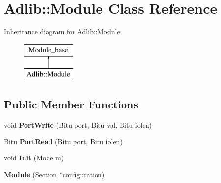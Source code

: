 \hypertarget{classAdlib_1_1Module}{\section{Adlib\-:\-:Module Class Reference}
\label{classAdlib_1_1Module}
}
Inheritance diagram for Adlib\-:\-:Module\-:\begin{figure}[H]
\begin{center}
\leavevmode
\includegraphics[height=2.000000cm]{classAdlib_1_1Module}
\end{center}
\end{figure}
\subsection*{Public Member Functions}
\begin{DoxyCompactItemize}
\item 
\hypertarget{classAdlib_1_1Module_a5c9cf02d284320239eae4e38984b521b}{void {\bfseries Port\-Write} (Bitu port, Bitu val, Bitu iolen)}\label{classAdlib_1_1Module_a5c9cf02d284320239eae4e38984b521b}

\item 
\hypertarget{classAdlib_1_1Module_a31c1330e9e59f170193d8b69e4d6f7a2}{Bitu {\bfseries Port\-Read} (Bitu port, Bitu iolen)}\label{classAdlib_1_1Module_a31c1330e9e59f170193d8b69e4d6f7a2}

\item 
\hypertarget{classAdlib_1_1Module_a525ffe536a1279048d36e154e45f61e8}{void {\bfseries Init} (Mode m)}\label{classAdlib_1_1Module_a525ffe536a1279048d36e154e45f61e8}

\item 
\hypertarget{classAdlib_1_1Module_a85409fe391b5ff9ad9854e244490f01c}{{\bfseries Module} (\hyperlink{classSection}{Section} $\ast$configuration)}\label{classAdlib_1_1Module_a85409fe391b5ff9ad9854e244490f01c}

\end{DoxyCompactItemize}

